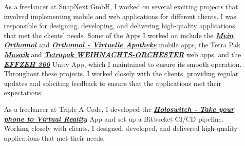 \documentclass[10pt,a4paper]{altacv}
\begin{document}
\begin{itemize}
\begin{fullwidth}
\newline
\newline
\divider




As a freelancer at SnapNext GmbH, I worked on several exciting projects that involved implementing mobile and web applications for different clients. I was responsible for designing, developing, and delivering high-quality applications that met the clients' needs. Some of the Apps I worked on include the \href{https://bit.ly/3tEGnTf}{\textit{\textbf{Mein Orthomol}}} and \href{https://bit.ly/3DfgH2S}{\textit{\textbf{Orthomol - Virtuelle Apotheke}}} mobile apps, the Tetra Pak  \href{https://tetra-pak-mosaik.web.app/}{\textit{\textbf{ Mosaik}}} and \href{https://tetrapak-dabf7.web.app/}{\textit{\textbf{Tetrapak WEIHNACHTS-ORCHESTER}}} web apps, and the \href{https://bit.ly/3DcJzJ5}{\textit{\textbf{EFFZEH 360}}} Unity App, which I maintained to ensure its smooth operation. Throughout these projects, I worked closely with the clients, providing regular updates and soliciting feedback to ensure that the applications met their expectations.
\newline



\newline


\divider


As a freelancer at Triple A Code, I developed the \href{https://bit.ly/3IHeeiF}{\textit{\textbf{Holoswitch - Take your phone to Virtual Reality}}} App and set up a Bitbucket CI/CD pipeline. Working closely with clients, I designed, developed, and delivered high-quality applications that met their needs.
\newline



\end{fullwidth}
\end{itemize}
\end{document}
